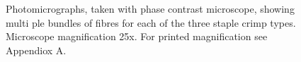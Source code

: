 \documentclass{article}
\begin{document}
\begin{figure}
\begin{turn}{90}
\begin{minipage}[c][\textwidth][c]{\textheight}
 \hfill
 \hfill
\caption{Photomicrographs, taken with phase contrast microscope, showing multi
ple bundles of fibres for each of the three staple crimp types. Microscope magnification 25x. For printed magnification see Appendiox A.}
\label{skin:hs}
\end{minipage}
\end{turn}
\end{figure}
\end{document}

